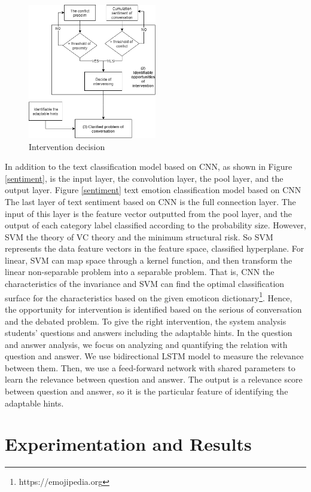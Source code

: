 \documentclass[letterpaper%
, twoside%
, 12pt%
,these%
, english%
,creativecommons,hyperref, withAlgo2e %
]{thETS}
\begin{document}
\begin{figure}
	\includegraphics[width=0.5\textwidth]{Figures/tsv.png}
	\caption{Intervention decision}
	\label{decide}
\end{figure}
In addition to the text classification model based on CNN, as shown in Figure \ref{sentiment}, is the input layer, the convolution layer, the pool layer, and the output layer. Figure \ref{sentiment} text emotion classification model based on CNN The last layer of text sentiment based on CNN is the full connection layer. The input of this layer is the feature vector outputted from the pool layer, and the output of each category label classified according to the probability size. However, SVM the theory of  VC theory and the minimum structural risk. So SVM represents the data feature vectors in the feature space, classified hyperplane.  For linear,  SVM can map space through a kernel function, and then transform the linear non-separable problem into a separable problem.  That is,  CNN the characteristics of the invariance and SVM can find the optimal classification surface for the characteristics based on the given emoticon dictionary\footnote{https://emojipedia.org}. Hence, the opportunity for intervention is identified based on the serious of conversation and the debated problem. To give the right intervention, the system analysis students' questions and answers including the adaptable hints. In the question and answer analysis, we focus on analyzing and quantifying the relation with question and answer. We use bidirectional LSTM model to measure the relevance between them. Then, we use a feed-forward network with shared parameters to learn the relevance between question and answer. The output is a relevance score between question and answer, so it is the particular feature of identifying the adaptable hints. 


\chapter{Experimentation and Results}
\end{document}
